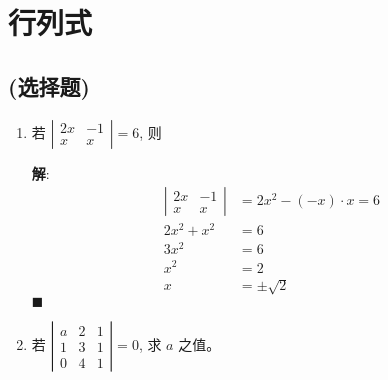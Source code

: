 \documentclass{report}
\newcommand{\sol}{\vspace{0.2cm}\textbf{解}:}
\begin{document}
\section{行列式}

\subsection*{(选择题)}
\begin{enumerate}
  \item 若 $\left|\begin{array}{cc}2 x & -1 \\ x & x\end{array}\right|=6$, 则

        \sol{}
        \begin{align*}
          \left|\begin{array}{cc}2 x & -1 \\ x & x\end{array}\right| & = 2x^2 - (-x) \cdot x = 6 \\
          2x^2 + x^2                                                 & = 6                       \\
          3x^2                                                       & = 6                       \\
          x^2                                                        & = 2                       \\
          x                                                          & = \pm \sqrt{2}
        \end{align*} \hfill$\blacksquare$

  \item 若 $\left|\begin{array}{lll}a & 2 & 1 \\ 1 & 3 & 1 \\ 0 & 4 & 1\end{array}\right|=0$, 求 $a$ 之值。


\end{enumerate}
\end{document}
